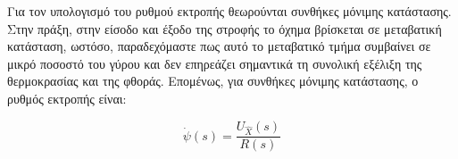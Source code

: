 Για τον υπολογισμό του ρυθμού εκτροπής θεωρούνται συνθήκες μόνιμης κατάστασης. Στην πράξη, στην είσοδο και έξοδο της στροφής το όχημα βρίσκεται σε μεταβατική κατάσταση, ωστόσο, παραδεχόμαστε πως αυτό το μεταβατικό τμήμα συμβαίνει σε μικρό ποσοστό του γύρου και δεν επηρεάζει σημαντικά τη συνολική εξέλιξη της θερμοκρασίας και της φθοράς. Επομένως, για συνθήκες μόνιμης κατάστασης, ο ρυθμός εκτροπής είναι:

\begin{equation}
    \dot{\psi}(s) = \dfrac{U_{\hat{X}}(s)}{R(s)}
    \label{eq:steadyStateYawRate}
\end{equation}

